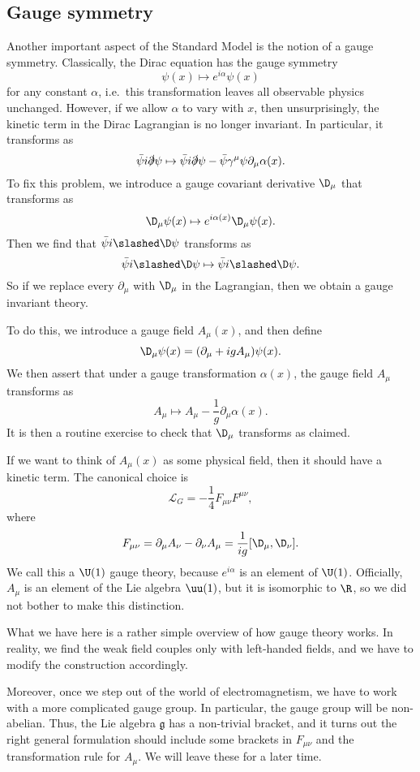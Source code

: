 \documentclass[a4paper]{article}
\begin{document}
\subsection{Gauge symmetry}
Another important aspect of the Standard Model is the notion of a gauge symmetry. Classically, the Dirac equation has the gauge symmetry
\[
  \psi(x) \mapsto e^{i\alpha}\psi(x)
\]
for any constant $\alpha$, i.e.\, this transformation leaves all observable physics unchanged. However, if we allow $\alpha$ to vary with $x$, then unsurprisingly, the kinetic term in the Dirac Lagrangian is no longer invariant. In particular, it transforms as
\[
  \bar\psi i \slashed\partial \psi \mapsto \bar\psi i \slashed\partial \psi - \bar\psi \gamma^\mu \psi \partial_\mu \alpha (x).
\]
To fix this problem, we introduce a gauge covariant derivative $\D_\mu$ that transforms as
\[
  \D_\mu \psi(x) \mapsto e^{i\alpha (x)} \D_\mu \psi(x).
\]
Then we find that $\bar\psi i \slashed \D \psi$ transforms as
\[
  \bar\psi i \slashed \D \psi \mapsto \bar\psi i \slashed \D \psi.
\]
So if we replace every $\partial_\mu$ with $\D_\mu$ in the Lagrangian, then we obtain a gauge invariant theory.

To do this, we introduce a gauge field $A_\mu(x)$, and then define
\[
  \D_\mu \psi(x) = (\partial_\mu + i g A_\mu) \psi(x).
\]
We then assert that under a gauge transformation $\alpha(x)$, the gauge field $A_\mu$ transforms as
\[
  A_\mu \mapsto A_\mu - \frac{1}{g} \partial_\mu \alpha(x).
\]
It is then a routine exercise to check that $\D_\mu$ transforms as claimed.

If we want to think of $A_\mu(x)$ as some physical field, then it should have a kinetic term. The canonical choice is
\[
  \mathcal{L}_G = -\frac{1}{4} F_{\mu\nu} F^{\mu\nu},
\]
where
\[
  F_{\mu\nu} = \partial_\mu A_\nu - \partial_\nu A_\mu = \frac{1}{ig} [\D_\mu, \D_\nu].
\]
We call this a $\U(1)$ gauge theory, because $e^{i\alpha}$ is an element of $\U(1)$. Officially, $A_\mu$ is an element of the Lie algebra $\uu(1)$, but it is isomorphic to $\R$, so we did not bother to make this distinction.

What we have here is a rather simple overview of how gauge theory works. In reality, we find the weak field couples only with left-handed fields, and we have to modify the construction accordingly.

Moreover, once we step out of the world of electromagnetism, we have to work with a more complicated gauge group. In particular, the gauge group will be non-abelian. Thus, the Lie algebra $\mathfrak{g}$ has a non-trivial bracket, and it turns out the right general formulation should include some brackets in $F_{\mu\nu}$ and the transformation rule for $A_\mu$. We will leave these for a later time.
\end{document}
